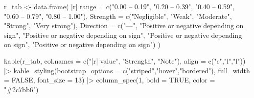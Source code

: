 \documentclass[
  12pt,
  letterpaper,
]{book}
\newenvironment{Shaded}{\begin{snugshade}}{\end{snugshade}}
\newcommand{\AttributeTok}[1]{\textcolor[rgb]{0.40,0.45,0.13}{#1}}
\newcommand{\ConstantTok}[1]{\textcolor[rgb]{0.56,0.35,0.01}{#1}}
\newcommand{\DecValTok}[1]{\textcolor[rgb]{0.68,0.00,0.00}{#1}}
\newcommand{\FunctionTok}[1]{\textcolor[rgb]{0.28,0.35,0.67}{#1}}
\newcommand{\NormalTok}[1]{\textcolor[rgb]{0.00,0.23,0.31}{#1}}
\newcommand{\OtherTok}[1]{\textcolor[rgb]{0.00,0.23,0.31}{#1}}
\newcommand{\SpecialCharTok}[1]{\textcolor[rgb]{0.37,0.37,0.37}{#1}}
\newcommand{\StringTok}[1]{\textcolor[rgb]{0.13,0.47,0.30}{#1}}
\begin{document}
\begin{Shaded}
\begin{Highlighting}[]
\NormalTok{r\_tab }\OtherTok{\textless{}{-}} \FunctionTok{data.frame}\NormalTok{(}
  \StringTok{\textasciigrave{}}\AttributeTok{|r| range}\StringTok{\textasciigrave{}} \OtherTok{=} \FunctionTok{c}\NormalTok{(}\StringTok{"0.00 – 0.19"}\NormalTok{, }\StringTok{"0.20 – 0.39"}\NormalTok{,}
                   \StringTok{"0.40 – 0.59"}\NormalTok{, }\StringTok{"0.60 – 0.79"}\NormalTok{, }\StringTok{"0.80 – 1.00"}\NormalTok{),}
  \AttributeTok{Strength =} \FunctionTok{c}\NormalTok{(}\StringTok{"Negligible"}\NormalTok{, }\StringTok{"Weak"}\NormalTok{, }\StringTok{"Moderate"}\NormalTok{, }\StringTok{"Strong"}\NormalTok{, }\StringTok{"Very strong"}\NormalTok{),}
  \AttributeTok{Direction =} \FunctionTok{c}\NormalTok{(}\StringTok{"—"}\NormalTok{, }\StringTok{"Positive or negative depending on sign"}\NormalTok{,}
                \StringTok{"Positive or negative depending on sign"}\NormalTok{,}
                \StringTok{"Positive or negative depending on sign"}\NormalTok{,}
                \StringTok{"Positive or negative depending on sign"}\NormalTok{)}
\NormalTok{)}

\FunctionTok{kable}\NormalTok{(r\_tab, }\AttributeTok{col.names =} \FunctionTok{c}\NormalTok{(}\StringTok{"|r| value"}\NormalTok{, }\StringTok{"Strength"}\NormalTok{, }\StringTok{"Note"}\NormalTok{),}
      \AttributeTok{align =} \FunctionTok{c}\NormalTok{(}\StringTok{"c"}\NormalTok{,}\StringTok{"l"}\NormalTok{,}\StringTok{"l"}\NormalTok{)) }\SpecialCharTok{|\textgreater{}}
  \FunctionTok{kable\_styling}\NormalTok{(}\AttributeTok{bootstrap\_options =} \FunctionTok{c}\NormalTok{(}\StringTok{"striped"}\NormalTok{,}\StringTok{"hover"}\NormalTok{,}\StringTok{"bordered"}\NormalTok{),}
                \AttributeTok{full\_width =} \ConstantTok{FALSE}\NormalTok{, }\AttributeTok{font\_size =} \DecValTok{13}\NormalTok{) }\SpecialCharTok{|\textgreater{}}
  \FunctionTok{column\_spec}\NormalTok{(}\DecValTok{1}\NormalTok{, }\AttributeTok{bold =} \ConstantTok{TRUE}\NormalTok{, }\AttributeTok{color =} \StringTok{"\#2c7bb6"}\NormalTok{)}
\end{Highlighting}
\end{Shaded}

\begingroup\fontsize{13}{15}\selectfont
\end{document}
